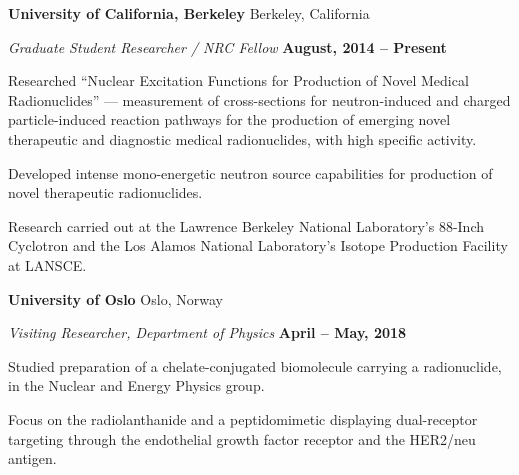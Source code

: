 
{\bf University of California, Berkeley} \hfill{ Berkeley, California}

\vspace*{-.05in}
{\em Graduate Student Researcher / NRC Fellow} \hfill {\bf August, 2014 -- Present}

\begin{list2}
\item  
Researched \enquote{Nuclear Excitation Functions for Production of Novel Medical Radionuclides} ---  
measurement of cross-sections for neutron-induced and charged particle-induced reaction pathways for the production of emerging novel therapeutic and diagnostic medical radionuclides, with high specific activity.  
\item  Developed intense mono-energetic neutron source capabilities for production of novel therapeutic radionuclides.
\item  Research carried out at 
the Lawrence Berkeley National Laboratory's 88-Inch Cyclotron and the Los Alamos National Laboratory's  Isotope Production Facility at LANSCE.
\end{list2}


{\bf University of Oslo} \hfill{ Oslo, Norway}

\vspace*{-.05in}
{\em Visiting Researcher, Department of Physics} \hfill {\bf April -- May,  2018}

\begin{list2}
\item    Studied preparation of a chelate-conjugated biomolecule carrying a radionuclide, in the Nuclear and Energy Physics group. 
\item    Focus on the radiolanthanide  and a peptidomimetic displaying dual-receptor targeting through the endothelial growth factor receptor and the HER2/neu antigen.
\end{list2}

